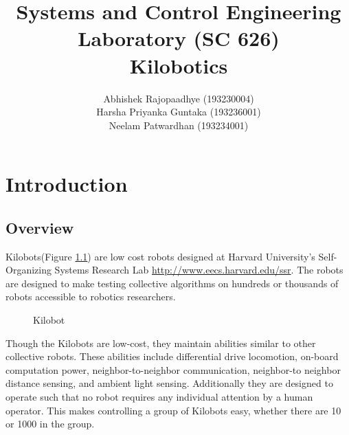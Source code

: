 \documentclass{report}[12pt]
\author{Abhishek Rajopaadhye (193230004) \\ Harsha Priyanka Guntaka (193236001) \\ Neelam Patwardhan (193234001)}
\title{Systems and Control Engineering Laboratory (SC 626) \\ Kilobotics}
\begin{document}
\maketitle
\tableofcontents
\listoffigures
\thispagestyle{empty}
\mbox{}

\chapter{Introduction}

\section{Overview}
Kilobots(Figure \ref{fig:Kilobot}) are low cost robots designed at Harvard University's Self-Organizing Systems Research Lab \href{http://www.eecs.harvard.edu/ssr}{http://www.eecs.harvard.edu/ssr}. The robots are designed to make testing collective algorithms on hundreds or thousands of robots accessible to robotics researchers.  

\begin{figure}[H]
	\centering
	\caption{Kilobot}
	\label{fig:Kilobot}
\end{figure}

Though the Kilobots are low-cost, they maintain abilities  similar  to  other  collective  robots. These  abilities  include differential drive locomotion, on-board computation power, neighbor-to-neighbor communication, neighbor-to  neighbor distance sensing, and ambient light sensing. Additionally they are designed to operate such that no robot requires any individual attention by a human operator. This makes controlling a group of Kilobots easy, whether there are 10 or 1000 in the group.
\end{document}
